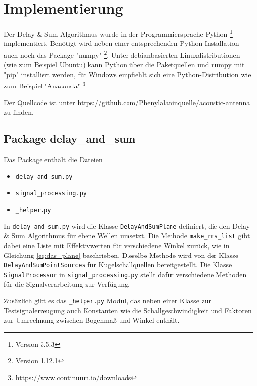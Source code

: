 \section{Implementierung}
	
	Der Delay \& Sum Algorithmus wurde in der Programmiersprache Python \footnote{Version 3.5.3} implementiert. Benötigt wird neben einer entsprechenden Python-Installation auch noch das Package "numpy" \footnote{Version 1.12.1}. Unter debianbasierten Linuxdistributionen (wie zum Beispiel Ubuntu) kann Python über die Paketquellen und numpy mit "pip" installiert werden, für Windows empfiehlt sich eine Python-Distribution wie zum Beispiel "Anaconda" \footnote{https://www.continuum.io/downloads}.
	
	Der Quellcode ist unter https://github.com/Phenylalaninquelle/acoustic-antenna zu finden.
	
	\subsection{Package delay\_and\_sum}
	
	Das Package enthält die Dateien
	\begin{itemize}
		\item \texttt{delay\_and\_sum.py}
		\item \texttt{signal\_processing.py}
		\item \texttt{\_helper.py}
	\end{itemize}
	In \texttt{delay\_and\_sum.py} wird die Klasse \texttt{DelayAndSumPlane} definiert, die den Delay \& Sum Algorithmus für ebene Wellen umsetzt. Die Methode \texttt{make\_rms\_list} gibt dabei eine Liste mit Effektivwerten für verschiedene Winkel zurück, wie in Gleichung \ref{eq:das_plane} beschrieben. Dieselbe Methode wird von der Klasse \texttt{DelayAndSumPointSources} für Kugelschallquellen bereitgestellt.
	Die Klasse \texttt{SignalProcessor} in \texttt{signal\_processing.py} stellt dafür verschiedene Methoden für die Signalverarbeitung zur Verfügung.
	
	Zusäzlich gibt es das \texttt{\_helper.py} Modul, das neben einer Klasse zur Testsignalerzeugung auch Konstanten wie die Schallgeschwindigkeit und Faktoren zur Umrechnung zwischen Bogenmaß und Winkel enthält.